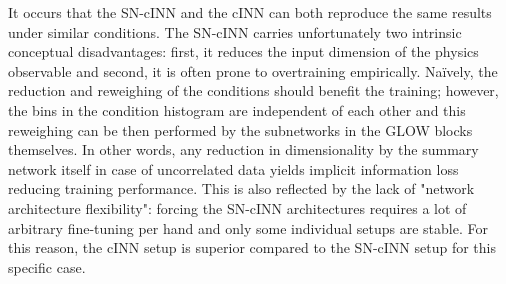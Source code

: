 It occurs that the SN-cINN and the cINN can both reproduce the same results under similar conditions. The SN-cINN carries unfortunately two intrinsic conceptual disadvantages: first, it reduces the input dimension of the physics observable and second, it is often prone to overtraining empirically. Naïvely, the reduction and reweighing of the conditions should benefit the training; however, the bins in the condition histogram are independent of each other and this reweighing can be then performed by the subnetworks in the GLOW blocks themselves. In other words, any reduction in dimensionality by the summary network itself in case of uncorrelated data yields implicit information loss reducing training performance. This is also reflected by the lack of "network architecture flexibility": forcing the SN-cINN architectures requires a lot of arbitrary fine-tuning per hand and only some individual setups are stable. For this reason, the cINN setup is superior compared to the SN-cINN setup for this specific case.